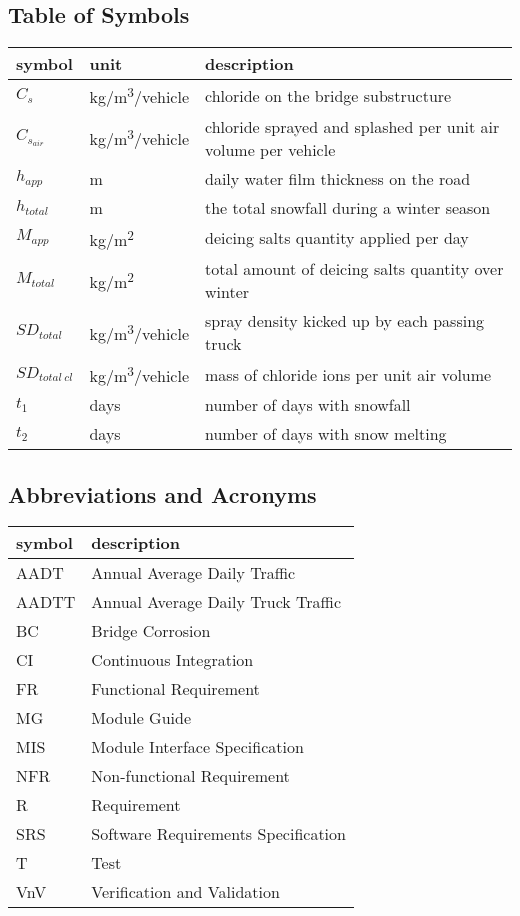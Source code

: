 \documentclass[12pt, titlepage]{article}
\begin{document}
\subsection{Table of Symbols}
\noindent \begin{tabular}{l l p{12cm}} \toprule
\textbf{symbol} & \textbf{unit} & \textbf{description}\\
\midrule 
$C_s$ & \si{kg/m^3/vehicle} & chloride on the bridge substructure\\
$C_{s_{air}}$ & \si{kg/m^3/vehicle} & chloride sprayed and splashed per unit air volume per vehicle\\
$h_{app}$ & \si{m} & daily water film thickness on the road\\
$h_{total}$ & \si{m} & the total snowfall during a winter season\\
$M_{app}$ & \si{kg/m^2} & deicing salts quantity applied per day\\
$M_{total}$ & \si{kg/m^2} & total amount of deicing salts quantity over winter\\
$SD_{total}$ & \si{kg/m^{3}/vehicle} & spray density kicked up by each passing truck\\
$SD_{total~cl}$ & \si{kg/m^3/vehicle} & mass of chloride ions per unit air volume\\
$t_1$ & days & number of days with snowfall\\
$t_2$ & days & number of days with snow melting\\
\bottomrule
\end{tabular}



\subsection{Abbreviations and Acronyms}

\renewcommand{\arraystretch}{1.2}
\begin{tabular}{l l} 
  \toprule		
  \textbf{symbol} & \textbf{description}\\
  \midrule 

  AADT & Annual Average Daily Traffic\\
  AADTT & Annual Average Daily Truck Traffic \\
  BC & Bridge Corrosion\\
  CI & Continuous Integration\\
  FR & Functional Requirement\\
  MG & Module Guide\\
  MIS & Module Interface Specification\\
  NFR & Non-functional Requirement\\
  R & Requirement\\
  SRS & Software Requirements Specification\\
  T & Test\\
  VnV & Verification and Validation\\
  
  \bottomrule
\end{tabular}\\
\end{document}
